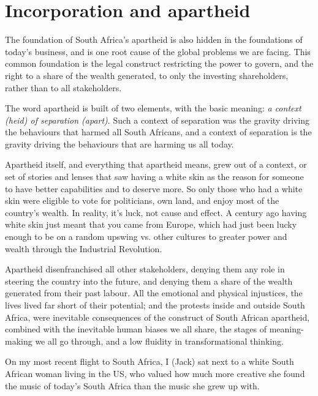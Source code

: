 \section{Incorporation and apartheid}
The foundation of South Africa’s apartheid is also hidden in the foundations of today’s business, and is one root cause of the global problems we are facing. This common foundation is the legal construct restricting the power to govern, and the right to a share of the wealth generated, to only the investing shareholders, rather than to all stakeholders.


The word apartheid is built of two elements, with the basic meaning: \emph{a context (heid) of separation (apart)}. Such a context of separation was the gravity driving the behaviours that harmed all South Africans, and a context of separation is the gravity driving the behaviours that are harming us all today. 


Apartheid itself, and everything that apartheid means, grew out of a context, or set of stories and lenses that saw having a white skin as the reason for someone to have better capabilities and to deserve more. So only those who had a white skin were eligible to vote for politicians, own land, and enjoy most of the country’s wealth. In reality, it’s luck, not cause and effect. A century ago having white skin just meant that you came from Europe, which had just been lucky enough to be on a random upswing vs. other cultures to greater power and wealth through the Industrial Revolution.


Apartheid disenfranchised all other stakeholders, denying them any role in steering the country into the future, and denying them a share of the wealth generated from their past labour. All the emotional and physical injustices, the lives lived far short of their potential; 
and the protests inside and outside South Africa, were inevitable consequences of the construct of South African apartheid, combined with the inevitable human biases we all share, the stages of meaning\hyp{}making we all go through, and a low fluidity in transformational thinking.


\begin{longstoryblock}
On my most recent flight to South Africa, I (Jack) sat next to a white South African woman living in the US, who valued how much more creative she found the music of today's South Africa than the music she grew up with.
\end{longstoryblock}



